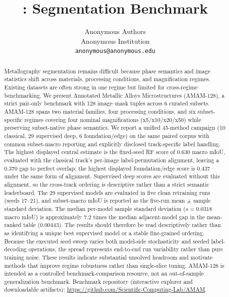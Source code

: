 \documentclass{article}
\title{\datasetname{}: \datasetfull{} Segmentation Benchmark}
\author{%
  Anonymous Authors\\
  Anonymous Institution\\
  \texttt{anonymous@anonymous.edu}
}
\newcommand{\datasetname}{AMAM-128}
\newcommand{\datasetfull}{Annotated Metallic Alloys Microstructures}
\newcommand{\paircount}{128}
\newcommand{\subsetcount}{6}
\begin{document}
\maketitle

\begin{abstract}
Metallography segmentation remains difficult because phase semantics and image
statistics shift across materials, processing conditions, and magnification
regimes. Existing datasets are often strong in one regime but limited for
cross-regime benchmarking. We present \datasetfull{} (\datasetname{}), a strict
pair-only benchmark with \paircount{} image--mask tuples across \subsetcount{}
curated subsets. \datasetname{} spans two material families, four processing
conditions, and six subset-specific regimes covering four nominal
magnifications (x5/x10/x20/x50) while preserving subset-native phase semantics.
We report a unified 45-method campaign (10 classical, 29 supervised deep, 6
foundation/edge) on the same paired corpus with common subset-macro reporting
and explicitly disclosed track-specific label handling.
The highest displayed central estimate is the fixed-seed RF score of 0.630
macro mIoU, evaluated with the classical track's per-image label-permutation
alignment, leaving a 0.370 gap to perfect overlap; the highest displayed
foundation/edge score is 0.437 under the same form of alignment. Supervised deep scores
are evaluated without this alignment, so the cross-track ordering is
descriptive rather than a strict semantic leaderboard.
The 29 supervised models are evaluated in five clean retraining runs (seeds
17--21), and subset-macro mIoU is reported as the five-run mean $\pm$ sample
standard deviation. The median per-model sample standard deviation
($s=0.0318$ macro mIoU) is approximately 7.2 times the median adjacent-model
gap in the mean-ranked table ($0.00443$). The results should therefore be read
descriptively rather than as identifying a unique best supervised model or a
stable fine-grained ordering. Because the executed seed sweep varies both model-side stochasticity
and seeded label-decoding operations, the spread represents end-to-end run
variability rather than pure training noise. These results indicate
substantial unsolved headroom and motivate methods that improve regime
robustness rather than single-slice tuning. \datasetname{} is intended as a
controlled benchmark-comparison resource, not an out-of-sample generalization
benchmark. Benchmark repository (interactive explorer and downloadable
artifacts): \url{https://github.com/Scientific-Computing-Lab/AMAM}.
\end{abstract}
\end{document}
